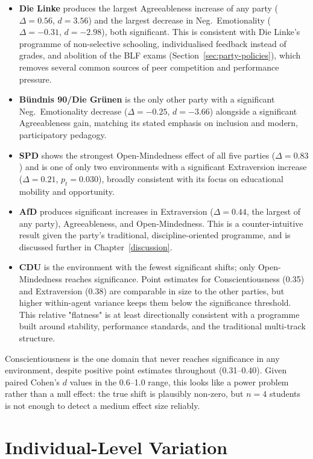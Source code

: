 \begin{itemize}
\item \textbf{Die Linke} produces the largest Agreeableness increase of any party ($\Delta=0.56$, $d=3.56$) and the largest decrease in Neg.\ Emotionality ($\Delta=-0.31$, $d=-2.98$), both significant. This is consistent with Die Linke's programme of non-selective schooling, individualised feedback instead of grades, and abolition of the BLF exams (Section~\ref{sec:party-policies}), which removes several common sources of peer competition and performance pressure.
\item \textbf{B\"undnis 90/Die Gr\"unen} is the only other party with a significant Neg.\ Emotionality decrease ($\Delta=-0.25$, $d=-3.66$) alongside a significant Agreeableness gain, matching its stated emphasis on inclusion and modern, participatory pedagogy.
\item \textbf{SPD} shows the strongest Open-Mindedness effect of all five parties ($\Delta=0.83$) and is one of only two environments with a significant Extraversion increase ($\Delta=0.21$, $p_t=0.030$), broadly consistent with its focus on educational mobility and opportunity.
\item \textbf{AfD} produces significant increases in Extraversion ($\Delta=0.44$, the largest of any party), Agreeableness, and Open-Mindedness. This is a counter-intuitive result given the party's traditional, discipline-oriented programme, and is discussed further in Chapter~\ref{discussion}.
\item \textbf{CDU} is the environment with the fewest significant shifts; only Open-Mindedness reaches significance. Point estimates for Conscientiousness (0.35) and Extraversion (0.38) are comparable in size to the other parties, but higher within-agent variance keeps them below the significance threshold. This relative "flatness" is at least directionally consistent with a programme built around stability, performance standards, and the traditional multi-track structure.
\end{itemize}

Conscientiousness is the one domain that never reaches significance in any environment, despite positive point estimates throughout (0.31--0.40). Given paired Cohen's $d$ values in the 0.6--1.0 range, this looks like a power problem rather than a null effect: the true shift is plausibly non-zero, but $n=4$ students is not enough to detect a medium effect size reliably.

\section{Individual-Level Variation} \label{sec:individual-level}

